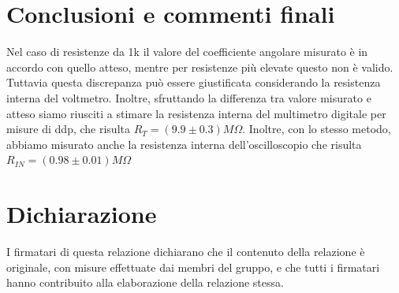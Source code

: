 \documentclass[10pt,a4paper]{article}
\begin{document}
\section{Conclusioni e commenti finali}
Nel caso di resistenze da 1k il valore del coefficiente angolare misurato è in accordo con quello atteso, mentre per resistenze più elevate questo non è valido. Tuttavia questa discrepanza può essere giustificata considerando la resistenza interna del voltmetro. Inoltre, sfruttando la differenza tra valore misurato e atteso siamo riusciti a stimare la resistenza interna del multimetro digitale per misure di ddp, che risulta $R_T = ( 9.9\pm  0.3)  M\Omega$. Inoltre, con lo stesso metodo, abbiamo misurato anche la resistenza interna dell'oscilloscopio che risulta $R_{IN} = (0.98 \pm  0.01)  M\Omega$ 

\section*{Dichiarazione}
I firmatari di questa relazione dichiarano che il contenuto della relazione \`e originale, con misure effettuate dai membri del gruppo, e che tutti i firmatari hanno contribuito alla elaborazione della relazione stessa.
\end{document}
